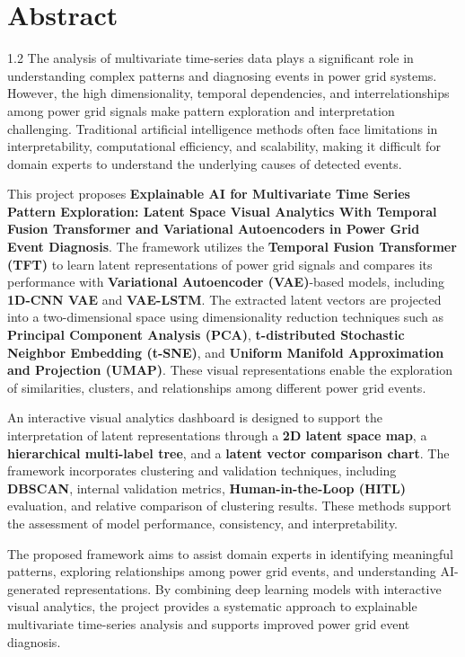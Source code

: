 \chapter*{Abstract}%
%
\vspace{-25pt}

\begin{spacing}{1.2}
\noindent The analysis of multivariate time-series data plays a significant role in understanding complex patterns and diagnosing events in power grid systems. However, the high dimensionality, temporal dependencies, and interrelationships among power grid signals make pattern exploration and interpretation challenging. Traditional artificial intelligence methods often face limitations in interpretability, computational efficiency, and scalability, making it difficult for domain experts to understand the underlying causes of detected events.

\vspace{8pt}

\noindent This project proposes \textbf{Explainable AI for Multivariate Time Series Pattern Exploration: Latent Space Visual Analytics With Temporal Fusion Transformer and Variational Autoencoders in Power Grid Event Diagnosis}. The framework utilizes the \textbf{Temporal Fusion Transformer (TFT)} to learn latent representations of power grid signals and compares its performance with \textbf{Variational Autoencoder (VAE)}-based models, including \textbf{1D-CNN VAE} and \textbf{VAE-LSTM}. The extracted latent vectors are projected into a two-dimensional space using dimensionality reduction techniques such as \textbf{Principal Component Analysis (PCA)}, \textbf{t-distributed Stochastic Neighbor Embedding (t-SNE)}, and \textbf{Uniform Manifold Approximation and Projection (UMAP)}. These visual representations enable the exploration of similarities, clusters, and relationships among different power grid events.

\vspace{8pt}

\noindent An interactive visual analytics dashboard is designed to support the interpretation of latent representations through a \textbf{2D latent space map}, a \textbf{hierarchical multi-label tree}, and a \textbf{latent vector comparison chart}. The framework incorporates clustering and validation techniques, including \textbf{DBSCAN}, internal validation metrics, \textbf{Human-in-the-Loop (HITL)} evaluation, and relative comparison of clustering results. These methods support the assessment of model performance, consistency, and interpretability.

\vspace{8pt}

\noindent The proposed framework aims to assist domain experts in identifying meaningful patterns, exploring relationships among power grid events, and understanding AI-generated representations. By combining deep learning models with interactive visual analytics, the project provides a systematic approach to explainable multivariate time-series analysis and supports improved power grid event diagnosis.
\end{spacing}

\thispagestyle{plain}
